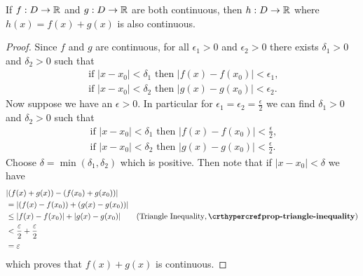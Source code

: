 \begin{proposition}\label{prop-sum-of-continuous-functions-is-continuous}
    If $f: D \to \mathbb{R}$ and $g: D \to \mathbb{R}$ are both continuous, then $h: D \to \mathbb{R}$ where $h(x) = f(x) + g(x)$ is also continuous.
\end{proposition}
\begin{proof}
    Since $f$ and $g$ are continuous, for all $\epsilon_1 > 0$ and $\epsilon_2 > 0$ there exists $\delta_1 > 0$ and $\delta_2 > 0$ such that
    \begin{gather*}
        \text{ if } |x - x_0| < \delta_1 \text{ then } |f(x) - f(x_0)| < \epsilon_1,\\
        \text{ if } |x - x_0| < \delta_2 \text{ then } |g(x) - g(x_0)| < \epsilon_2.
    \end{gather*}
    Now suppose we have an $\epsilon > 0$. In particular for $\epsilon_1 = \epsilon_2 = \frac\epsilon2$ we can find $\delta_1 > 0$ and $\delta_2 > 0$ such that
    \begin{gather*}
        \text{ if } |x - x_0| < \delta_1 \text{ then } |f(x) - f(x_0)| < \frac\epsilon2,\\
        \text{ if } |x - x_0| < \delta_2 \text{ then } |g(x) - g(x_0)| < \frac\epsilon2.
    \end{gather*}
    Choose $\delta = \min(\delta_1, \delta_2)$ which is positive. Then note that if $|x - x_0| < \delta$ we have
    \begin{align*}
        &|(f(x) + g(x)) - (f(x_0) + g(x_0))|\\
        &= |(f(x) - f(x_0)) + (g(x) - g(x_0))|\\
        &\leq |f(x) - f(x_0)| + |g(x) - g(x_0)| & (\text{Triangle Inequality}, \myref{prop-triangle-inequality})\\
        &< \frac\epsilon2 + \frac\epsilon2\\
        &= \epsilon
    \end{align*}
    which proves that $f(x) + g(x)$ is continuous.
\end{proof}


